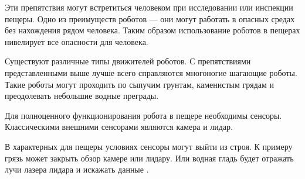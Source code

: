 Эти препятствия могут встретиться человеком при исследовании или инспекции пещеры. Одно из преимуществ роботов --- они могут работать в опасных средах без нахождения рядом человека. Таким образом использование роботов в пещерах нивелирует все опасности для человека.

Существуют различные типы движителей роботов. С препятствиями представленными выше лучше всего справляются многоногие шагающие роботы. Такие роботы могут проходить по сыпучим грунтам, каменистым грядам и преодолевать небольшие водные преграды.

Для полноценного функционирования робота в пещере необходимы сенсоры. Классическими внешними сенсорами являются камера и лидар.

В характерных для пещеры условиях сенсоры могут выйти из строя. К примеру грязь  может закрыть обзор камере или лидару. Или водная гладь  будет отражать лучи лазера лидара и искажать данные .

